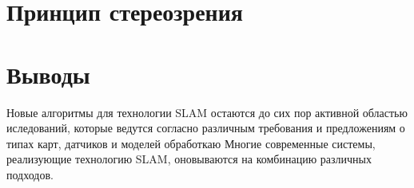 \section{Принцип стереозрения}



\section{Выводы}
\label{conclusion}

Новые алгоритмы для технологии SLAM остаются до сих пор активной областью иследований, которые ведутся согласно различным требования и предложениям о типах карт, датчиков и моделей обработкаю Многие современные системы, реализующие технологию SLAM, оновываются на комбинацию различных подходов.







\newpage




